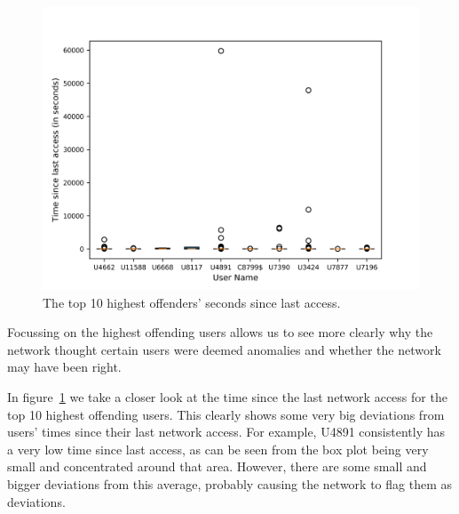 \begin{figure}
	\begin{center}
		\includegraphics[scale=1.6]{results/highest_offender_time_since_last_access}
	\end{center}
	\caption{The top 10 highest offenders' seconds since last access.~\label{fig:time_since_last_access}}
\end{figure}

Focussing on the highest offending users allows us to see more clearly why the network thought certain users were deemed anomalies and whether the network may have been right.

In figure~\ref{fig:time_since_last_access} we take a closer look at the time since the last network access for the top 10 highest offending users. This clearly shows some very big deviations from users' times since their last network access. For example, U4891 consistently has a very low time since last access, as can be seen from the box plot being very small and concentrated around that area. However, there are some small and bigger deviations from this average, probably causing the network to flag them as deviations.

